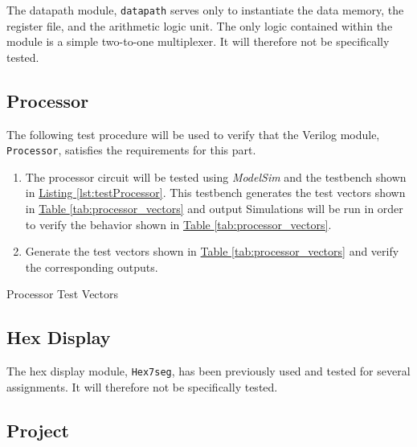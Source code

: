 The datapath module, \verb|datapath| serves only to instantiate the data memory, the register file, and the arithmetic logic unit.
The only logic contained within the module is a simple two-to-one multiplexer.
It will therefore not be specifically tested.


\subsection{Processor} %
\label{sub:processor_pro}

The following test procedure will be used to verify that the Verilog module, \verb|Processor|, satisfies the requirements for this part.

\begin{enumerate}
    \item The processor circuit will be tested using \emph{ModelSim} and the testbench shown in \hyperref[lst:testProcessor]{Listing \ref*{lst:testProcessor}}.
    This testbench generates the test vectors shown in \hyperref[tab:processor_vectors]{Table \ref*{tab:processor_vectors}} and output %
    Simulations will be run in order to verify the behavior shown in \hyperref[tab:processor_vectors]{Table \ref*{tab:processor_vectors}}.
    \item Generate the test vectors shown in \hyperref[tab:processor_vectors]{Table \ref*{tab:processor_vectors}} and verify the corresponding outputs.
\end{enumerate}

\begin{table}[htbp]
    \centering
    \caption{Processor Test Vectors\label{tab:processor_vectors}}
\end{table}


\subsection{Hex Display} %
\label{sub:hex_display}

The hex display module, \verb|Hex7seg|, has been previously used and tested for several assignments.
It will therefore not be specifically tested.

\subsection{Project} %
\label{sub:project_pro}

